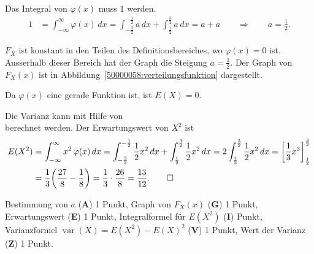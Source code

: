 \begin{loesung}
\begin{teilaufgaben}
\item
Das Integral von $\varphi(x)$ muss $1$ werden.
\begin{align*}
1&=
\int_{-\infty}^\infty \varphi(x)\,dx
=
\int_{-\frac32}^{-\frac12} a\,dx
+
\int_{\frac12}^{\frac32} a\,dx
=
a+a
\qquad\Rightarrow\qquad a=\frac12.
\end{align*}
\item
$F_X$ ist konstant in den Teilen des Definitionsbereiches, wo
$\varphi(x)=0$ ist.
Ausserhalb dieser Bereich hat der Graph die Steigung $a=\frac12$.
Der Graph von $F_X(x)$ ist in Abbildung~\ref{50000058:verteilungsfunktion}
dargestellt.
\item
Da $\varphi(x)$ eine gerade Funktion ist, ist $E(X)=0$.
\item
Die Varianz kann mit Hilfe von
\[
\]
berechnet werden.
Der Erwartungswert von $X^2$ ist
\begin{align*}
E(X^2)
&=
\int_{-\infty}^\infty x^2\,\varphi(x)\,dx
=
\int_{-\frac32}^{-\frac12}\frac12x^2\,dx
+
\int_{\frac12}^{\frac32}\frac12x^2\,dx
=
2\int_{\frac12}^{\frac32}\frac12x^2\,dx
=
\biggl[\frac13x^3\biggr]_{\frac12}^{\frac32}
\\
&=
\frac13\biggl(\frac{27}{8} - \frac18\biggr)
=
\frac13\cdot\frac{26}{8}
=
\frac{13}{12}.
\qedhere
\end{align*}
\end{teilaufgaben}
\end{loesung}

\begin{bewertung}
Bestimmung von $a$ ({\bf A}) 1 Punkt,
Graph von $F_X(x)$ ({\bf G}) 1 Punkt,
Erwartungswert ({\bf E}) 1 Punkt,
Integralformel für $E(X^2)$ ({\bf I}) Punkt,
Varianzformel $\operatorname{var}(X)=E(X^2)-E(X)^2$ ({\bf V}) 1 Punkt,
Wert der Varianz ({\bf Z}) 1 Punkt.
\end{bewertung}
